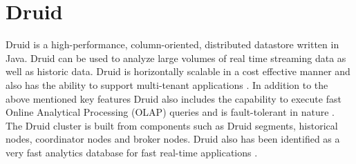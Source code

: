 \section{Druid}

Druid is a high-performance, column-oriented, distributed datastore written in 
Java. Druid can be used to analyze large volumes of real time streaming data as 
well as historic data. Druid is horizontally scalable in a cost effective 
manner and also has the ability to support multi-tenant applications 
\cite{hid-sp18-416-www-druid-wikipedia}. In addition to the above mentioned key 
features Druid also includes the capability to execute fast Online Analytical 
Processing (OLAP) queries and is fault-tolerant in nature 
\cite{hid-sp18-416-www-about-druid}. The Druid cluster is built from components 
such as Druid segments, historical nodes, coordinator nodes and broker nodes. 
Druid also has been identified as a very fast analytics database for fast 
real-time applications \cite{hid-sp18-416-www-fast-dataanalytics-druid-blog}.